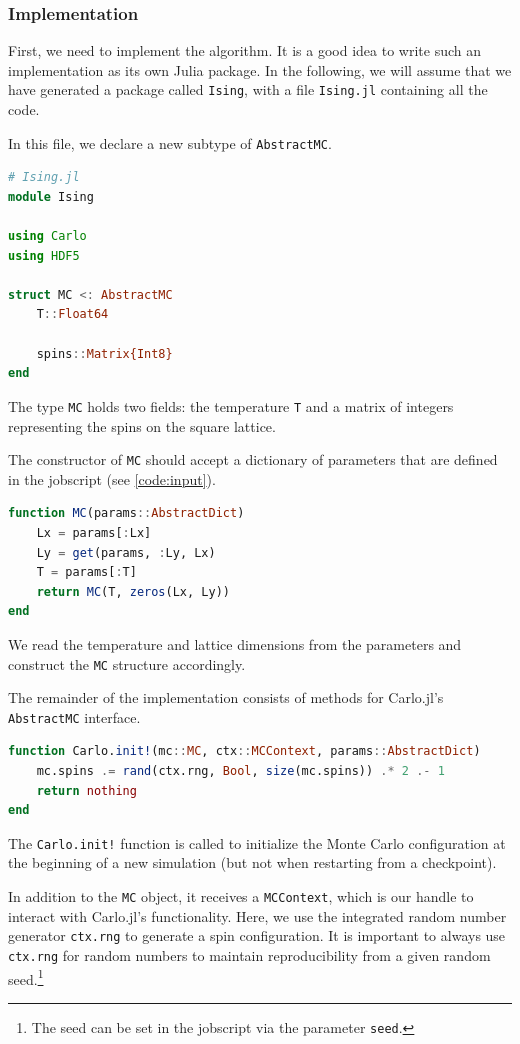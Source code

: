 \documentclass{SciPost}
\begin{document}
\subsubsection{Implementation}
First, we need to implement the algorithm. It is a good idea to write such an implementation as its own Julia package. In the following, we will assume that we have generated a package called \texttt{Ising}, with a file \texttt{Ising.jl} containing all the code.

In this file, we declare a new subtype of \texttt{AbstractMC}.
\begin{lstlisting}[language=julia]
# Ising.jl
module Ising

using Carlo
using HDF5

struct MC <: AbstractMC
    T::Float64

    spins::Matrix{Int8}
end
\end{lstlisting}
The type \texttt{MC} holds two fields: the temperature \texttt{T} and a matrix of integers representing the spins on the square lattice.

The constructor of \texttt{MC} should accept a dictionary of parameters that are defined in the jobscript (see \cref{code:input}).
\begin{lstlisting}[language=julia]
function MC(params::AbstractDict)
    Lx = params[:Lx]
    Ly = get(params, :Ly, Lx)
    T = params[:T]
    return MC(T, zeros(Lx, Ly))
end
\end{lstlisting}
We read the temperature and lattice dimensions from the parameters and construct the \texttt{MC} structure accordingly.

The remainder of the implementation consists of methods for Carlo.jl's \texttt{AbstractMC} interface.

\begin{lstlisting}[language=julia]
function Carlo.init!(mc::MC, ctx::MCContext, params::AbstractDict)
    mc.spins .= rand(ctx.rng, Bool, size(mc.spins)) .* 2 .- 1
    return nothing
end
\end{lstlisting}
The \texttt{Carlo.init!} function is called to initialize the Monte Carlo configuration at the beginning of a new simulation (but not when restarting from a checkpoint).

In addition to the \texttt{MC} object, it receives a \texttt{MCContext}, which is our handle to interact with Carlo.jl's functionality. Here, we use the integrated random number generator \texttt{ctx.rng} to generate a spin configuration. It is important to always use \texttt{ctx.rng} for random numbers to maintain reproducibility from a given random seed.\footnote{The seed can be set in the jobscript via the parameter \texttt{seed}.}
\end{document}
